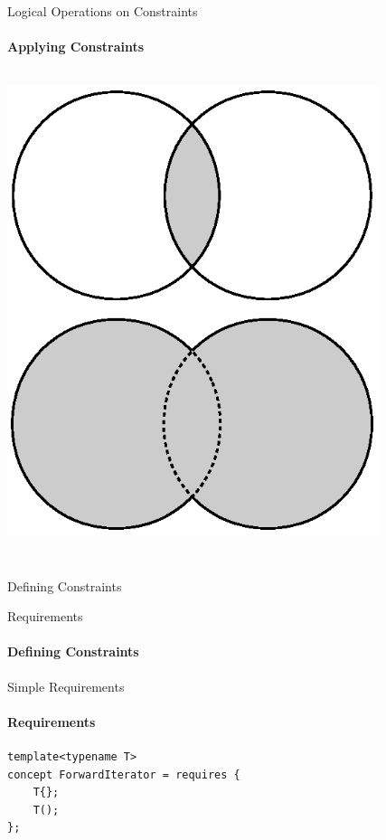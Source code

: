 \documentclass{beamer}
\begin{document}
    \begin{frame}[fragile]{Logical Operations on Constraints}
        \framesubtitle{Applying Constraints}
        \begin{columns}
            \begin{center}
                \includegraphics[width=0.815\textwidth]{figures/logical.eps}
            \end{center}
        \end{columns}
        \begin{center}
        \begin{lstlisting}[caption={}]
\end{lstlisting}
        \end{center}
    \end{frame}

    \begin{frame}[fragile]{Defining Constraints}
    \end{frame}

    \begin{frame}[fragile]{Requirements}
        \framesubtitle{Defining Constraints}
    \end{frame}

    \begin{frame}[fragile]{Simple Requirements}
        \framesubtitle{Requirements}
        \begin{center}
        \begin{lstlisting}[caption={...}]
template<typename T>
concept ForwardIterator = requires {
    T{};
    T();
}; \end{lstlisting}
        \end{center}
    \end{frame}
\end{document}
